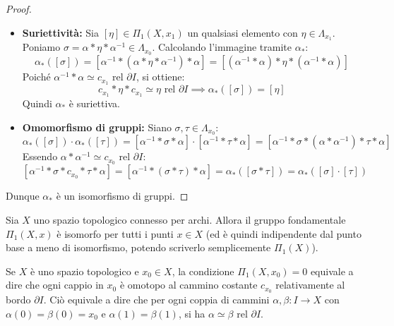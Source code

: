 \begin{proof}
\begin{itemize}
    Concatenando a sinistra per $\alpha$ e a destra per $\alpha^{-1}$:
    \[
    \alpha * (\alpha^{-1} * \sigma * \alpha) * \alpha^{-1} \simeq \alpha * (\alpha^{-1} * \tau * \alpha) * \alpha^{-1} \text{ rel } \partial I
    \]
    Usando l'associatività e i risultati sugli elementi inversi e neutri ($\alpha * \alpha^{-1} \simeq c_{x_0}$):
    \[
    c_{x_0} * \sigma * c_{x_0} \simeq c_{x_0} * \tau * c_{x_0} \implies \sigma \simeq \tau \text{ rel } \partial I \implies [\sigma] = [\tau]
    \]
    Pertanto $\alpha_*$ è iniettiva.

    \item \textbf{Suriettività:} Sia $[\eta] \in \Pi_1(X, x_1)$ un qualsiasi elemento con $\eta \in \Lambda_{x_1}$.
    Poniamo $\sigma = \alpha * \eta * \alpha^{-1} \in \Lambda_{x_0}$. Calcolando l'immagine tramite $\alpha_*$:
    \[
    \alpha_*([\sigma]) = [\alpha^{-1} * (\alpha * \eta * \alpha^{-1}) * \alpha] = [(\alpha^{-1} * \alpha) * \eta * (\alpha^{-1} * \alpha)]
    \]
    Poiché $\alpha^{-1} * \alpha \simeq c_{x_1} \text{ rel } \partial I$, si ottiene:
    \[
    c_{x_1} * \eta * c_{x_1} \simeq \eta \text{ rel } \partial I \implies \alpha_*([\sigma]) = [\eta]
    \]
    Quindi $\alpha_*$ è suriettiva.

    \item \textbf{Omomorfismo di gruppi:} Siano $\sigma, \tau \in \Lambda_{x_0}$:
    \[
    \alpha_*([\sigma]) \cdot \alpha_*([\tau]) = [\alpha^{-1} * \sigma * \alpha] \cdot [\alpha^{-1} * \tau * \alpha] = [\alpha^{-1} * \sigma * (\alpha * \alpha^{-1}) * \tau * \alpha]
    \]
    Essendo $\alpha * \alpha^{-1} \simeq c_{x_0} \text{ rel } \partial I$:
    \[
    [\alpha^{-1} * \sigma * c_{x_0} * \tau * \alpha] = [\alpha^{-1} * (\sigma * \tau) * \alpha] = \alpha_*([\sigma * \tau]) = \alpha_*([\sigma] \cdot [\tau])
    \]
\end{itemize}
Dunque $\alpha_*$ è un isomorfismo di gruppi.
\end{proof}

\begin{coro}
Sia $X$ uno spazio topologico connesso per archi. Allora il gruppo fondamentale $\Pi_1(X, x)$ è isomorfo per tutti i punti $x \in X$ (ed è quindi indipendente dal punto base a meno di isomorfismo, potendo scriverlo semplicemente $\Pi_1(X)$).
\end{coro}

\begin{observacion}
Se $X$ è uno spazio topologico e $x_0 \in X$, la condizione $\Pi_1(X, x_0) = 0$ equivale a dire che ogni cappio in $x_0$ è omotopo al cammino costante $c_{x_0}$ relativamente al bordo $\partial I$. Ciò equivale a dire che per ogni coppia di cammini $\alpha, \beta: I \to X$ con $\alpha(0) = \beta(0) = x_0$ e $\alpha(1) = \beta(1)$, si ha $\alpha \simeq \beta \text{ rel } \partial I$.
\end{observacion}

